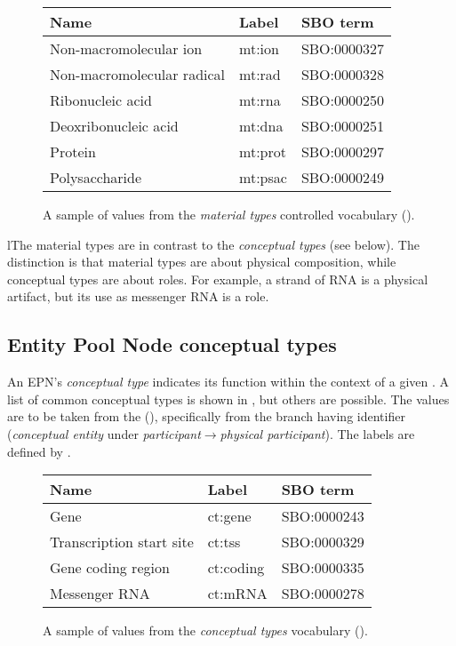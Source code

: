\begin{figure}[h]
  \centering
  \begin{tabular}{l>{\ttfamily}ll}
    \toprule
    \textbf{Name}              & \textbf{\rmfamily Label} & \textbf{SBO term} \\
    \midrule
    Non-macromolecular ion     & mt:ion  & SBO:0000327\\
    Non-macromolecular radical & mt:rad  & SBO:0000328\\
    Ribonucleic acid           & mt:rna  & SBO:0000250\\
    Deoxribonucleic acid       & mt:dna  & SBO:0000251\\
    Protein                    & mt:prot & SBO:0000297\\
    Polysaccharide             & mt:psac & SBO:0000249\\
    \bottomrule
  \end{tabular}
  \caption{A sample of values from the \emph{material types} controlled
    vocabulary ().}
  \label{fig:material-types-cv}
\end{figure}

lThe material types are in contrast to the \emph{conceptual types} (see below).  The distinction is that material types are about physical composition, while conceptual types are about roles.  For example, a strand of RNA is a physical artifact, but its use as messenger RNA is a role.


\subsection{Entity Pool Node conceptual types}
\label{sec:conceptual-types-cv}

An EPN's \emph{conceptual type} indicates its function within the context of a given \PD.  A list of common conceptual types is shown in , but others are possible.  The values are to be taken from the \sbo (\sbourl), specifically from the branch having identifier  (\emph{conceptual entity} under \emph{participant}$\rightarrow$\emph{physical participant}).  The labels are defined by \SBGNPDLone.

\begin{figure}[h]
  \centering
  \begin{tabular}{l>{\ttfamily}ll}
    \toprule
    \textbf{Name}              & \textbf{\rmfamily Label} & \textbf{SBO term} \\
    \midrule
    Gene                      & ct:gene   & SBO:0000243\\
    Transcription start site  & ct:tss    & SBO:0000329\\
    Gene coding region        & ct:coding & SBO:0000335\\
    Messenger RNA             & ct:mRNA   & SBO:0000278\\
    \bottomrule
  \end{tabular}
  \caption{A sample of values from the \emph{conceptual types} vocabulary
    ().}
  \label{fig:conceptual-types-cv}
\end{figure}


